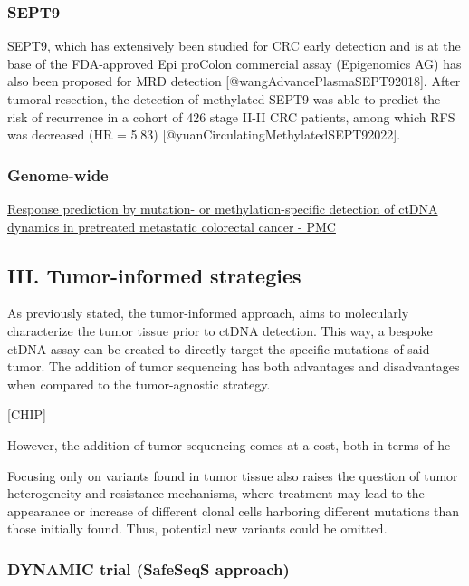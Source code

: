 \documentclass[
]{article}
\begin{document}
\subsubsection{SEPT9}\label{sept9}

SEPT9, which has extensively been studied for CRC early detection and is
at the base of the FDA-approved Epi proColon commercial assay
(Epigenomics AG) has also been proposed for MRD detection
{[}@wangAdvancePlasmaSEPT92018{]}. After tumoral resection, the
detection of methylated SEPT9 was able to predict the risk of recurrence
in a cohort of 426 stage II-II CRC patients, among which RFS was
decreased (HR = 5.83) {[}@yuanCirculatingMethylatedSEPT92022{]}.

\subsubsection{Genome-wide}\label{genome-wide}

\href{https://www.ncbi.nlm.nih.gov/pmc/articles/PMC10541738/}{Response
prediction by mutation- or methylation-specific detection of ctDNA
dynamics in pretreated metastatic colorectal cancer - PMC}

\subsection{III. Tumor-informed
strategies}\label{iii.-tumor-informed-strategies}

As previously stated, the tumor-informed approach, aims to molecularly
characterize the tumor tissue prior to ctDNA detection. This way, a
bespoke ctDNA assay can be created to directly target the specific
mutations of said tumor. The addition of tumor sequencing has both
advantages and disadvantages when compared to the tumor-agnostic
strategy.

{[}CHIP{]}

However, the addition of tumor sequencing comes at a cost, both in terms
of he

Focusing only on variants found in tumor tissue also raises the question
of tumor heterogeneity and resistance mechanisms, where treatment may
lead to the appearance or increase of different clonal cells harboring
different mutations than those initially found. Thus, potential new
variants could be omitted.

\subsubsection{DYNAMIC trial (SafeSeqS
approach)}\label{dynamic-trial-safeseqs-approach}
\end{document}
